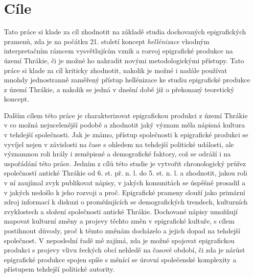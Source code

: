 
\section[cíle]{Cíle}

Tato práce si klade za cíl zhodnotit na základě studia dochovaných epigrafických pramenů, zda je na počátku 21. století koncept {\em hellénizace} vhodným interpretačním rámcem vysvětlujícím vznik a rozvoj epigrafické produkce na území Thrákie, či je možné ho nahradit novými metodologickými přístupy. Tato práce si klade za cíl kriticky zhodnotit, nakolik je možné i nadále používat mnohdy jednostranně zaměřený přístup hellénizace ke studiu epigrafické produkce z území Thrákie, a nakolik se jedná v dnešní době již o překonaný teoretický koncept.

Dalším cílem této práce je charakterizovat epigrafickou produkci z území Thrákie v co možná nejucelenější podobě a zhodnotit jaký význam měla nápisná kultura v tehdejší společnosti. Jak je známo, přístup společnosti k epigrafické produkci se vyvíjel nejen v závislosti na čase s ohledem na tehdejší politické události, ale významnou roli hrály i zeměpisné a demografické faktory, což se odráží i na uspořádání této práce. Jedním z cílů této studie je vytvořit chronologický průřez společností antické Thrákie od 6. st. př. n. l. do 5. st. n. l. a zhodnotit, jakou roli v ní zaujímal zvyk publikovat nápisy, v jakých komunitách se úspěšně prosadil a v jakých nedošlo k jeho rozvoji a proč. Epigrafické prameny slouží jako primární zdroj informací k diskuzi o proměňujících se demografických trendech, kulturních zvyklostech a složení společnosti antické Thrákie. Dochované nápisy umožňují mapovat kulturní změny a projevy těchto změn v epigrafické kultuře, s cílem postihnout důvody, proč k těmto změnám docházelo a jejich dopad na tehdejší společnost. V neposlední řadě mě zajímá, zda je možné spojovat epigrafickou produkci s projevy vlivu řeckých obcí nehledě na časové období, či zda je nárůst epigrafické produkce spojen spíše s měnící se úrovní společenské komplexity a přístupem tehdejší politické autority.

